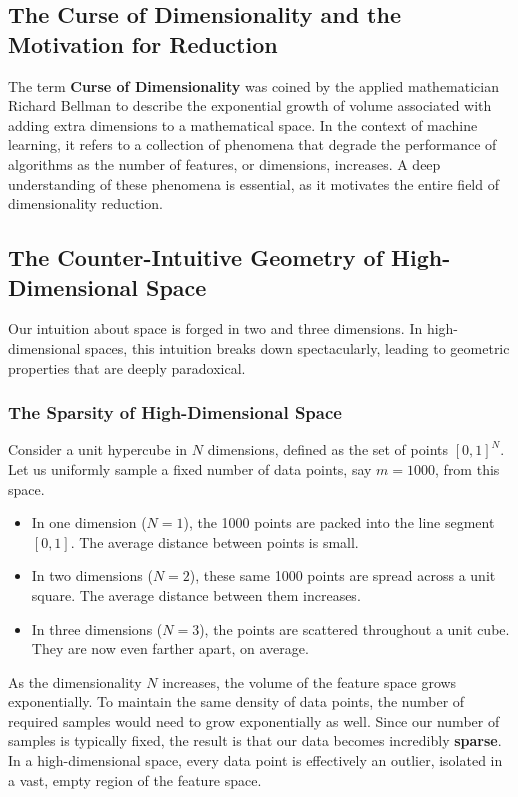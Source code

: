 \begin{itemize}
\section{The Curse of Dimensionality and the Motivation for Reduction}
\label{sec:curse_of_dimensionality}

The term \textbf{Curse of Dimensionality} was coined by the applied mathematician Richard Bellman to describe the exponential growth of volume associated with adding extra dimensions to a mathematical space. In the context of machine learning, it refers to a collection of phenomena that degrade the performance of algorithms as the number of features, or dimensions, increases. A deep understanding of these phenomena is essential, as it motivates the entire field of dimensionality reduction.

\subsection{The Counter-Intuitive Geometry of High-Dimensional Space}
Our intuition about space is forged in two and three dimensions. In high-dimensional spaces, this intuition breaks down spectacularly, leading to geometric properties that are deeply paradoxical.

\subsubsection{The Sparsity of High-Dimensional Space}
Consider a unit hypercube in $N$ dimensions, defined as the set of points $[0, 1]^N$. Let us uniformly sample a fixed number of data points, say $m=1000$, from this space.
\begin{itemize}
    \item In one dimension ($N=1$), the 1000 points are packed into the line segment $[0, 1]$. The average distance between points is small.
    \item In two dimensions ($N=2$), these same 1000 points are spread across a unit square. The average distance between them increases.
    \item In three dimensions ($N=3$), the points are scattered throughout a unit cube. They are now even farther apart, on average.
\end{itemize}
As the dimensionality $N$ increases, the volume of the feature space grows exponentially. To maintain the same density of data points, the number of required samples would need to grow exponentially as well. Since our number of samples is typically fixed, the result is that our data becomes incredibly \textbf{sparse}. In a high-dimensional space, every data point is effectively an outlier, isolated in a vast, empty region of the feature space.


\end{itemize}
